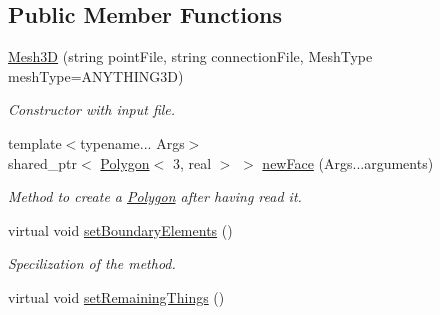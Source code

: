 \subsection*{Public Member Functions}
\begin{DoxyCompactItemize}
\item 
\hyperlink{class_mesh3_d_ab5b158493bd041915b32ff7c17570a8e}{Mesh3D} (string point\+File, string connection\+File, Mesh\+Type mesh\+Type=A\+N\+Y\+T\+H\+I\+N\+G3D)\hypertarget{class_mesh3_d_ab5b158493bd041915b32ff7c17570a8e}{}\label{class_mesh3_d_ab5b158493bd041915b32ff7c17570a8e}

\begin{DoxyCompactList}\small\item\em Constructor with input file. \end{DoxyCompactList}\item 
{\footnotesize template$<$typename... Args$>$ }\\shared\+\_\+ptr$<$ \hyperlink{class_polygon}{Polygon}$<$ 3, real $>$ $>$ \hyperlink{class_mesh3_d_a34d811780e44e448dc45f7142078a1d0}{new\+Face} (Args...\+arguments)\hypertarget{class_mesh3_d_a34d811780e44e448dc45f7142078a1d0}{}\label{class_mesh3_d_a34d811780e44e448dc45f7142078a1d0}

\begin{DoxyCompactList}\small\item\em Method to create a \hyperlink{class_polygon}{Polygon} after having read it. \end{DoxyCompactList}\item 
virtual void \hyperlink{class_mesh3_d_a5c90136ef98ac86c4bbd51eaa6c9b811}{set\+Boundary\+Elements} ()\hypertarget{class_mesh3_d_a5c90136ef98ac86c4bbd51eaa6c9b811}{}\label{class_mesh3_d_a5c90136ef98ac86c4bbd51eaa6c9b811}

\begin{DoxyCompactList}\small\item\em Specilization of the method. \end{DoxyCompactList}\item 
virtual void \hyperlink{class_mesh3_d_ab13f81c133cff51c5e386db23c5ec685}{set\+Remaining\+Things} ()\hypertarget{class_mesh3_d_ab13f81c133cff51c5e386db23c5ec685}{}\label{class_mesh3_d_ab13f81c133cff51c5e386db23c5ec685}


\end{DoxyCompactItemize}
